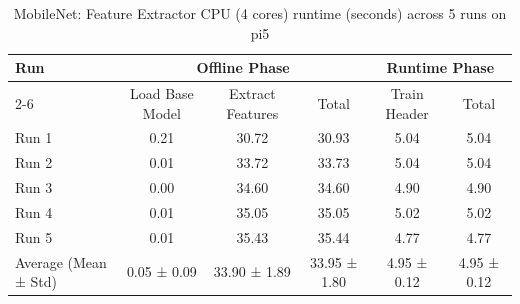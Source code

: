 \begin{table}[t]
\centering
\caption{MobileNet: Feature Extractor CPU (4 cores) runtime (seconds) across 5 runs on pi5}
\label{tab:runtime_mobilenet_CPU4_pi5}
\begin{tabular}{lccccc}
\hline
\multirow{2}{*}{Run} & \multicolumn{3}{c}{Offline Phase} & \multicolumn{2}{c}{Runtime Phase} \\
\cline{2-6}
 & Load Base Model & Extract Features & Total & Train Header & Total \\
\hline
  Run 1                  & 0.21           & 30.72          & 30.93          & 5.04           & 5.04           \\
  Run 2                  & 0.01           & 33.72          & 33.73          & 5.04           & 5.04           \\
  Run 3                  & 0.00           & 34.60          & 34.60          & 4.90           & 4.90           \\
  Run 4                  & 0.01           & 35.05          & 35.05          & 5.02           & 5.02           \\
  Run 5                  & 0.01           & 35.43          & 35.44          & 4.77           & 4.77           \\
\hline
  Average (Mean ± Std)   & 0.05 ± 0.09    & 33.90 ± 1.89   & 33.95 ± 1.80   & 4.95 ± 0.12    & 4.95 ± 0.12    \\
\hline
\end{tabular}
\end{table}
